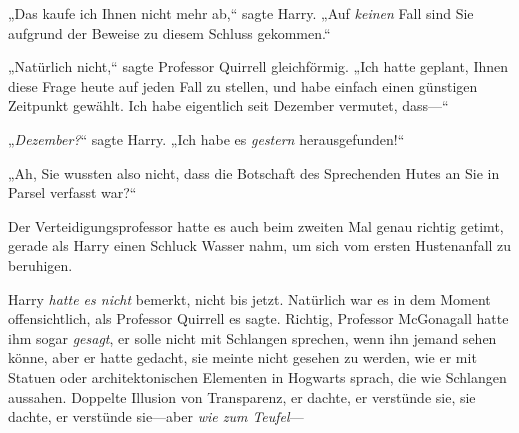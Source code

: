 „Das kaufe ich Ihnen nicht mehr ab,“ sagte Harry. „Auf \emph{keinen} Fall sind Sie aufgrund der Beweise zu diesem Schluss gekommen.“

„Natürlich nicht,“ sagte Professor Quirrell gleichförmig. „Ich hatte geplant, Ihnen diese Frage heute auf jeden Fall zu stellen, und habe einfach einen günstigen Zeitpunkt gewählt. Ich habe eigentlich seit Dezember vermutet, dass—“

„\emph{Dezember?}“ sagte Harry. „Ich habe es \emph{gestern} herausgefunden!“

„Ah, Sie wussten also nicht, dass die Botschaft des Sprechenden Hutes an Sie in Parsel verfasst war?“

Der Verteidigungsprofessor hatte es auch beim zweiten Mal genau richtig getimt, gerade als Harry einen Schluck Wasser nahm, um sich vom ersten Hustenanfall zu beruhigen.

Harry \emph{hatte es nicht} bemerkt, nicht bis jetzt. Natürlich war es in dem Moment offensichtlich, als Professor Quirrell es sagte. Richtig, Professor McGonagall hatte ihm sogar \emph{gesagt}, er solle nicht mit Schlangen sprechen, wenn ihn jemand sehen könne, aber er hatte gedacht, sie meinte nicht gesehen zu werden, wie er mit Statuen oder architektonischen Elementen in Hogwarts sprach, die wie Schlangen aussahen. Doppelte Illusion von Transparenz, er dachte, er verstünde sie, sie dachte, er verstünde sie—aber \emph{wie zum Teufel}—

